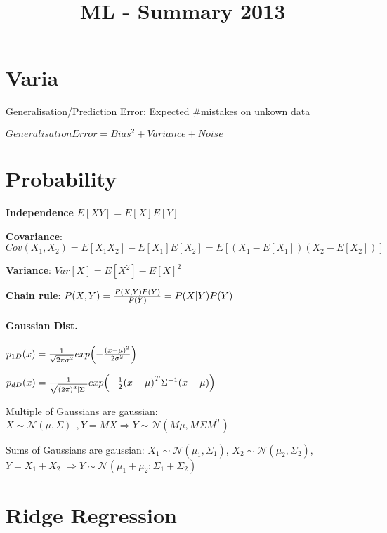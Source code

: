\documentclass[11pt,twocolumn]{article}
\begin{document}
\title{ML - Summary 2013}



\section{Varia}

Generalisation/Prediction Error: Expected \#mistakes on unkown data


$Generalisation Error = Bias^2 + Variance + Noise$	

\section{Probability}

\textbf{Independence} $E[XY] = E[X] E[Y]$

\textbf{Covariance}: $Cov(X_1, X_2) = E[X_1 X_2] - E[X_1] E[X_2] = E[(X_1 - E[X_1])(X_2-E[X_2])]$

\textbf{Variance}: $Var[X] = E[X^2] - E[X]^2$


\textbf{Chain rule}: $P(X,Y) = {{P(X,Y)P(Y)}\over{P(Y)}} = P(X|Y)P(Y)$



\paragraph{Gaussian Dist.}

$p_{1D}(x) = {1 \over {\sqrt{2 \pi \sigma^2}}} exp{\left( -{{\left(x - \mu\right)^2} \over{2 \sigma^2}} \right)}$


$p_{dD}(x) = {1 \over {\sqrt{{(2 \pi)}^d |\Sigma|}}} exp{\left( -{ {1 \over 2}  {\left(x - \mu\right)^T} \Sigma^{-1} {\left(x - \mu\right)}}\right)}$


Multiple of Gaussians are gaussian:
$X \sim  \mathcal{N}(\mu, \Sigma)~~, Y = MX \Rightarrow Y \sim \mathcal{N}(M\mu, M \Sigma M^T)$

Sums of Gaussians are gaussian:
$X_1 \sim \mathcal{N}(\mu_1, \Sigma_1)$,
$X_2 \sim \mathcal{N}(\mu_2, \Sigma_2)$, 
$Y=X_1 + X_2$
$\Rightarrow Y \sim \mathcal{N}(\mu_1 + \mu_2; \Sigma_1+\Sigma_2)$





\section{Ridge Regression}
\end{document}
